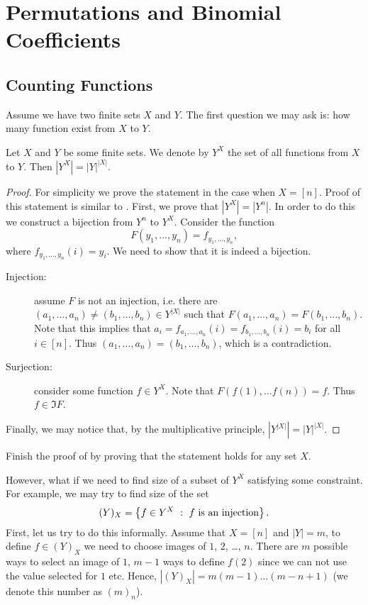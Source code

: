 \chapter{Permutations and Binomial Coefficients}
\section{Counting Functions}
Assume we have two finite sets $X$ and $Y$. The first question we may ask is:
how many function exist from $X$ to $Y$.


\begin{theorem}
\label{theorem:number-of-functions}
  Let $X$ and $Y$ be some finite sets. We denote by $Y^X$ the set of all
  functions from $X$ to $Y$. Then $|Y^X| = |Y|^{|X|}$.
\end{theorem}
\begin{proof}
  For simplicity we prove the statement in the case when $X = [n]$.
  Proof of this statement is similar to .
  First, we prove that $|Y^X| = |Y^n|$. In order to do this we construct
  a bijection from $Y^n$ to $Y^X$. Consider the function
  \[
    F(y_1, \dots, y_n) = f_{y_1, \dots, y_n},
  \]
  where $f_{y_1, \dots, y_n}(i) = y_{i}$. We need to show that it is indeed a
  bijection.
  \begin{description}
    \item[Injection:] assume $F$ is not an injection, i.e. there are
      $(a_1, \dots, a_n) \neq (b_1, \dots, b_n) \in Y^{|X|}$ such that
      $F(a_1, \dots, a_n) = F(b_1, \dots, b_n)$. Note that this implies that
      $a_i = f_{a_1, \dots, a_n}(i) =
        f_{b_1, \dots, b_n}(i) = b_i$ for all $i \in [n]$. Thus
      $(a_1, \dots, a_n) = (b_1, \dots, b_n)$, which is a contradiction.
    \item[Surjection:] consider some function $f \in Y^X$. Note that
      $F(f(1), \dots f(n)) = f$. Thus $f \in \Im F$.
  \end{description}

  Finally, we may notice that, by the multiplicative principle, $|Y^{|X|}| =
  |Y|^{|X|}$.
\end{proof}

\begin{exercise}
  Finish the proof of  by proving that
  the statement holds for any set $X$.
\end{exercise}

However, what if we need to find size of a subset of $Y^X$ satisfying some
constraint. For example, we may try to find size of the set
\[
  (Y)_X = \set[f\text{ is an injection}]{f \in Y^X}.
\]
First, let us try to do this informally. Assume that $X = [n]$ and $|Y| = m$,
to define $f \in (Y)_X$ we need to choose images of $1$, $2$, \dots, $n$. There
are $m$ possible ways to select an image of $1$, $m - 1$ ways to define $f(2)$
since we can not use the value selected for $1$ etc. Hence,
$|(Y)_X| = m (m - 1) \dots (m - n + 1)$ (we denote this number as $(m)_n$).


